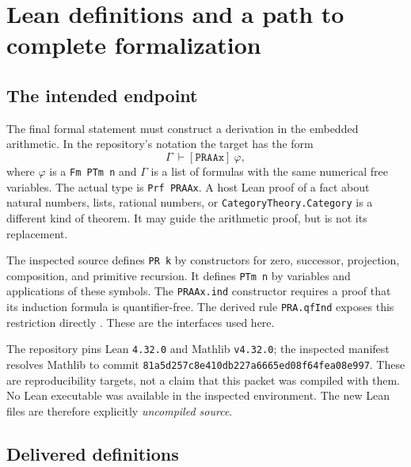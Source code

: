 \section{Lean definitions and a path to complete formalization}
\label{sec:lean}

\subsection{The intended endpoint}

The final formal statement must construct a derivation in the embedded
arithmetic. In the repository's notation the target has the form
\[
                 \Gamma\ \vdash[\texttt{PRAAx}]\ \varphi,
\]
where $\varphi$ is a \texttt{Fm PTm n} and $\Gamma$ is a list of formulas
with the same numerical free variables. The actual type is
\texttt{Prf PRAAx}. A host Lean proof of a fact about natural numbers,
lists, rational numbers, or \texttt{CategoryTheory.Category} is a different
kind of theorem. It may guide the arithmetic proof, but is not its
replacement.

The inspected source defines \texttt{PR k} by constructors for zero,
successor, projection, composition, and primitive recursion. It defines
\texttt{PTm n} by variables and applications of these symbols. The
\texttt{PRAAx.ind} constructor requires a proof that its induction formula
is quantifier-free. The derived rule \texttt{PRA.qfInd} exposes this
restriction directly \cite{repo-pr}. These are the interfaces used here.

The repository pins Lean \texttt{4.32.0} and Mathlib \texttt{v4.32.0}; the
inspected manifest resolves Mathlib to commit
\texttt{81a5d257c8e410db227a6665ed08f64fea08e997}. These are reproducibility
targets, not a claim that this packet was compiled with them. No Lean
executable was available in the inspected environment. The new Lean files
are therefore explicitly \emph{uncompiled source}.

\subsection{Delivered definitions}

